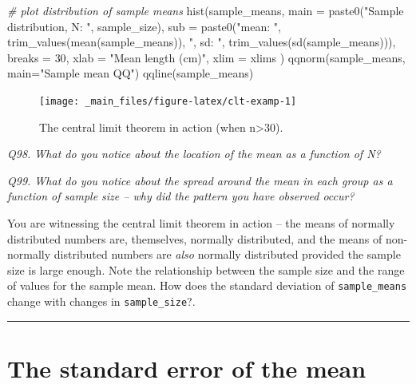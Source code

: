 \documentclass[
  11pt,
  a4paper,
]{book}
\newenvironment{Shaded}{\begin{snugshade}}{\end{snugshade}}
\newcommand{\AttributeTok}[1]{\textcolor[rgb]{0.77,0.63,0.00}{#1}}
\newcommand{\CommentTok}[1]{\textcolor[rgb]{0.56,0.35,0.01}{\textit{#1}}}
\newcommand{\DecValTok}[1]{\textcolor[rgb]{0.00,0.00,0.81}{#1}}
\newcommand{\FunctionTok}[1]{\textcolor[rgb]{0.00,0.00,0.00}{#1}}
\newcommand{\NormalTok}[1]{#1}
\newcommand{\StringTok}[1]{\textcolor[rgb]{0.31,0.60,0.02}{#1}}
\begin{document}
\begin{Shaded}
\begin{Highlighting}[]
\CommentTok{\# plot distribution of sample means}
\FunctionTok{hist}\NormalTok{(sample\_means,}
     \AttributeTok{main =} \FunctionTok{paste0}\NormalTok{(}\StringTok{"Sample distribution, N: "}\NormalTok{, sample\_size),}
     \AttributeTok{sub =} \FunctionTok{paste0}\NormalTok{(}\StringTok{"mean: "}\NormalTok{, }\FunctionTok{trim\_values}\NormalTok{(}\FunctionTok{mean}\NormalTok{(sample\_means)), }
                  \StringTok{", sd: "}\NormalTok{, }\FunctionTok{trim\_values}\NormalTok{(}\FunctionTok{sd}\NormalTok{(sample\_means))),}
     \AttributeTok{breaks =} \DecValTok{30}\NormalTok{, }\AttributeTok{xlab =} \StringTok{"Mean length (cm)"}\NormalTok{, }\AttributeTok{xlim =}\NormalTok{ xlims}
\NormalTok{) }
\FunctionTok{qqnorm}\NormalTok{(sample\_means, }\AttributeTok{main=}\StringTok{"Sample mean QQ"}\NormalTok{)}
\FunctionTok{qqline}\NormalTok{(sample\_means)}
\end{Highlighting}
\end{Shaded}

\begin{figure}

{\centering \texttt{[image: \_main\_files/figure-latex/clt-examp-1]} 

}

\caption{The central limit theorem in action (when n>30).}\label{fig:clt-examp}
\end{figure}

\emph{Q98. What do you notice about the location of the mean as a function of N?}

\emph{Q99. What do you notice about the spread around the mean in each group as a function of sample size -- why did the pattern you have observed occur?}

You are witnessing the central limit theorem in action -- the means of normally distributed numbers are, themselves, normally distributed, and the means of non-normally distributed numbers are \emph{also} normally distributed provided the sample size is large enough. Note the relationship between the sample size and the range of values for the sample mean. How does the standard deviation of \texttt{sample\_means} change with changes in \texttt{sample\_size}?.

\begin{center}\rule{0.5\linewidth}{0.5pt}\end{center}

\hypertarget{the-standard-error-of-the-mean}{%
\section{The standard error of the mean}\label{the-standard-error-of-the-mean}}
\end{document}
